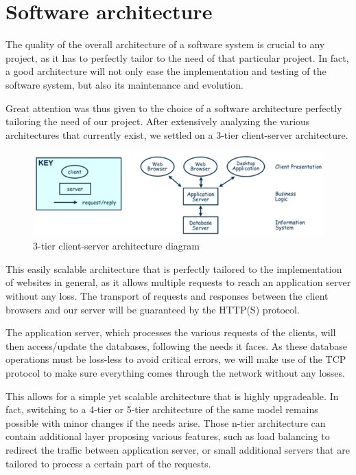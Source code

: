 \section{Software architecture}

The quality of the overall architecture of a software system is crucial to
any project, as it has to perfectly tailor to the need of that particular
project. In fact, a good architecture will not only ease the
implementation and testing of the software system, but also its maintenance
and evolution.\newline

Great attention was thus given to the choice of a software architecture
perfectly tailoring the need of our project. After extensively analyzing
the various architectures that currently exist, we settled on a 3-tier client-server
architecture. \newline

\begin{figure}[H]
	\centering
	\includegraphics[width=0.8\linewidth]{ClientServerArchitecture.png}
	\caption{3-tier client-server architecture diagram}
    \label{djangoclientserver}
\end{figure}

This easily scalable architecture that is perfectly tailored to the
implementation of websites in general, as it allows multiple requests to reach
an application server without any loss. The transport of requests and responses
between the client browsers and our server will be guaranteed by the HTTP(S)
protocol. \newline

The application server, which processes the various requests of the clients,
will then access/update the databases, following the needs it faces. As these
database operations must be loss-less to avoid critical errors, we will make
use of the TCP protocol to make sure everything comes through the network without
any losses. \newline

This allows for a simple yet scalable architecture that is highly upgradeable.
In fact, switching to a 4-tier or 5-tier architecture of the same model
remains possible with minor changes if the needs arise. Those n-tier
architecture can contain additional layer proposing various features, such
as load balancing to redirect the traffic between application server, or
small additional servers that are tailored to process a certain part of the
requests. \newline

